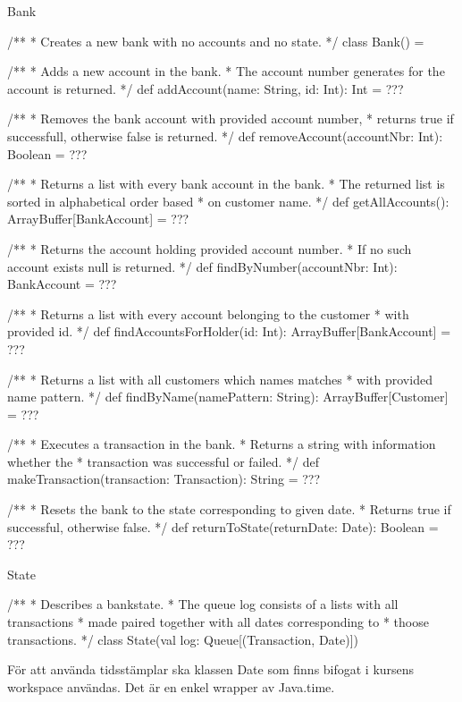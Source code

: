 \begin{ScalaSpec}{Bank}

/**
 * Creates a new bank with no accounts and no state. 
 */
class Bank() = {

  /**
   * Adds a new account in the bank.
   * The account number generates for the account is returned.
   */
  def addAccount(name: String, id: Int): Int = ???

 /**
   * Removes the bank account with provided account number,
   * returns true if successfull, otherwise false is returned.
   */
  def removeAccount(accountNbr: Int): Boolean = ???

 /**
   * Returns a list with every bank account in the bank.
   * The returned list is sorted in alphabetical order based
   * on customer name.
   */
  def getAllAccounts(): ArrayBuffer[BankAccount] = ???

  /**
   * Returns the account holding provided account number.
   * If no such account exists null is returned.
   */
  def findByNumber(accountNbr: Int): BankAccount = ???

/**
   * Returns a list with every account belonging to the customer
   * with provided id.
   */
  def findAccountsForHolder(id: Int): ArrayBuffer[BankAccount] = ???

/**
   * Returns a list with all customers which names matches
   * with provided name pattern.
   */
  def findByName(namePattern: String): ArrayBuffer[Customer] = ???

 /**
   * Executes a transaction in the bank.
   * Returns a string with information whether the
   * transaction was successful or failed.
   */
  def makeTransaction(transaction: Transaction): String = ???

 /**
   * Resets the bank to the state corresponding to given date.
   * Returns true if successful, otherwise false.
   */
  def returnToState(returnDate: Date): Boolean = ???

}
\end{ScalaSpec}


\begin{ScalaSpec}{State}

/**
 * Describes a bankstate.
 * The queue log consists of a lists with all transactions
 * made paired together with all dates corresponding to
 * thoose transactions.
 */
class State(val log: Queue[(Transaction, Date)]) 

\end{ScalaSpec}


För att använda tidsstämplar ska klassen Date som finns bifogat i kursens workspace användas. Det är en enkel wrapper av Java.time.


